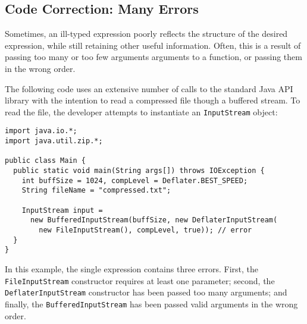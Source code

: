 \subsection{Code Correction: Many Errors}
\label{sec:examples:many}
Sometimes, an ill-typed expression poorly reflects the structure of the desired expression, while still retaining other useful information. Often, this is a result of passing too many or too few arguments arguments to a function, or passing them in the wrong order.

The following code uses an extensive number of calls to the standard Java API library with the intention to read a compressed file though a buffered stream. To read the file, the developer attempts to instantiate an \lstinline{InputStream} object:
\begin{lstlisting}
import java.io.*;
import java.util.zip.*;

public class Main {
  public static void main(String args[]) throws IOException {
    int buffSize = 1024, compLevel = Deflater.BEST_SPEED;
    String fileName = "compressed.txt";
    
    InputStream input = 
      new BufferedInputStream(buffSize, new DeflaterInputStream(
        new FileInputStream(), compLevel, true)); // error 
  }
}
\end{lstlisting}
In this example, the single expression contains three errors. First, the \lstinline{FileInputStream} constructor requires at least one parameter; second, the \lstinline{DeflaterInputStream} constructor has been passed too many arguments; and finally, the \lstinline{BufferedInputStream} has been passed valid arguments in the wrong order.

